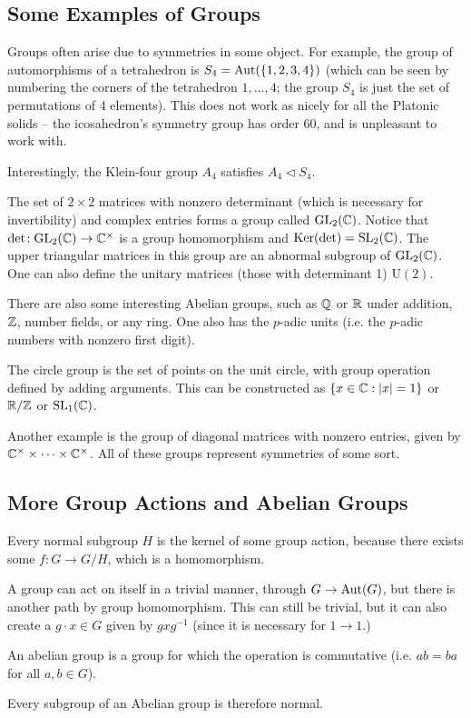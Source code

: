 \subsection{Some Examples of Groups}
Groups often arise due to symmetries in some object. For example, the group of automorphisms of a tetrahedron is $S_4 = \operatorname{Aut}(\{1,2,3,4\})$ (which can be seen by numbering the corners of the tetrahedron $1,\dots,4$; the group $S_4$ is just the set of permutations of 4 elements). This does not work as nicely for all the Platonic solids -- the icosahedron's symmetry group has order 60, and is unpleasant to work with.

Interestingly, the Klein-four group $A_4$ satisfies $A_4\!\vartriangleleft S_4$.

The set of $2\times 2$ matrices with nonzero determinant (which is necessary for invertibility) and complex entries forms a group called $\operatorname{GL}_{2}(\mathbb{C})$. Notice that $\det\!: \operatorname{GL}_{2}(\mathbb{C}) \to \mathbb{C}^\times$ is a group homomorphism and $\operatorname{Ker}(\det) = \operatorname{SL}_{2}(\mathbb{C})$. The upper triangular matrices in this group are an abnormal subgroup of $\operatorname{GL}_{2}(\mathbb{C})$. One can also define the unitary matrices (those with determinant 1) $\mathrm{U}(2)$.

There are also some interesting Abelian groups, such as $\mathbb{Q}$ or $\mathbb{R}$ under addition, $\mathbb{Z}$, number fields, or any ring. One also has the $p$-adic units (i.e. the $p$-adic numbers with nonzero first digit).

The circle group is the set of points on the unit circle, with group operation defined by adding arguments. This can be constructed as $\{x\in\mathbb{C}: |x| =1\}$ or $\mathbb{R}/\mathbb{Z}$ or $\operatorname{SL}_{1}(\mathbb{C})$.

Another example is the group of diagonal matrices with nonzero entries, given by $\mathbb{C}^\times \times \dots\times \mathbb{C}^\times$. All of these groups represent symmetries of some sort.
\subsection{More Group Actions and Abelian Groups}
Every normal subgroup $H$ is the kernel of some group action, because there exists some $f:G \to G/H$, which is a homomorphism.

A group can act on itself in a trivial manner, through $G\to\operatorname{Aut}(G)$, but there is another path by group homomorphism. This can still be trivial, but it can also create a $g\cdot x\in G$ given by $gxg^{-1}$ (since it is necessary for $1\to 1$.)
\begin{defn}
An abelian group is a group for which the operation is commutative (i.e. $ab = ba$ for all $a,b\in G$).
\end{defn}
Every subgroup of an Abelian group is therefore normal.

